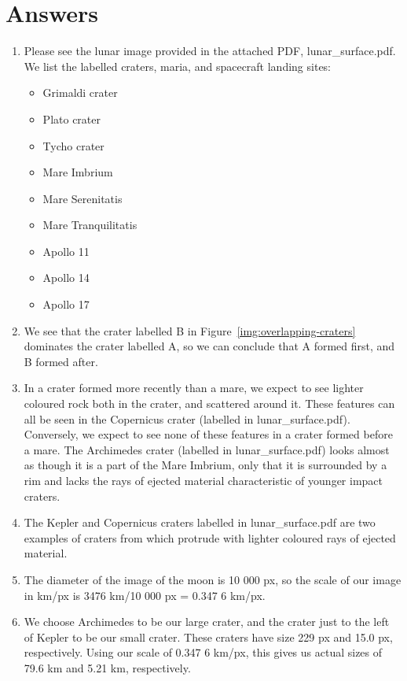 \documentclass[11pt]{article}
\begin{document}
\section{Answers}
\begin{enumerate}[label={\textbf{\emph{(\arabic*)}}}]
	\item %
Please see the lunar image provided in the attached PDF, lunar\_surface.pdf.
We list the labelled craters, maria, and spacecraft landing sites:
\begin{itemize}
\item Grimaldi crater
\item Plato crater
\item Tycho crater
\item Mare Imbrium
\item Mare Serenitatis
\item Mare Tranquilitatis
\item Apollo 11
\item Apollo 14
\item Apollo 17
\end{itemize}

	\item %
We see that the crater labelled B in Figure~\ref{img:overlapping-craters} dominates the crater labelled A, so we can conclude that A formed first, and B formed after.

	\item %
In a crater formed more recently than a mare, we expect to see lighter coloured rock both in the crater, and scattered around it.
These features can all be seen in the Copernicus crater (labelled in lunar\_surface.pdf).
Conversely, we expect to see none of these features in a crater formed before a mare.
The Archimedes crater (labelled in lunar\_surface.pdf) looks almost as though it is a part of the Mare Imbrium, only that it is surrounded by a rim and lacks the rays of ejected material characteristic of younger impact craters.

	\item %
The Kepler and Copernicus craters labelled in lunar\_surface.pdf are two examples of craters from which protrude with lighter coloured rays of ejected material.

	\item %
The diameter of the image of the moon is 10 000 px, so the scale of our image in km/px is 3476 km/10 000 px = 0.347 6 km/px.

	\item %
We choose Archimedes to be our large crater, and the crater just to the left of Kepler to be our small crater.
These craters have size 229 px and 15.0 px, respectively.
Using our scale of 0.347 6 km/px, this gives us actual sizes of 79.6 km and 5.21 km, respectively.


\end{enumerate}
\end{document}
